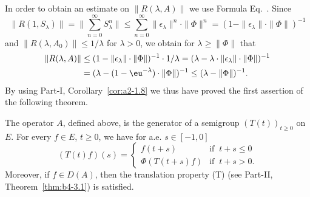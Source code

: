 In order to obtain an estimate on $\|R(\lambda,A)\|$ we use Formula Eq.~.
Since 
\[ 
\|R(1,S_{\lambda})\| = \|\sum_{n=0}^{\infty} S_{\lambda}^n\| \leq \sum_{n=0}^{\infty} \|\epsilon_{\lambda}\|^n \cdot \|\Phi\|^n = (1-\|\epsilon_{\lambda}\| \cdot \|\Phi\|)^{-1}
\]
and $\|R(\lambda,A_0)\| \leq 1/\lambda$ for $\lambda > 0$, we obtain for $\lambda \geq \|\Phi\|$ that
\begin{align*}
\|R(\lambda,A)\| &\leq (1 - \|\epsilon_{\lambda}\| \cdot \|\Phi\|)^{-1} \cdot 1/\lambda = (\lambda - \lambda \cdot \|\epsilon_{\lambda}\| \cdot \|\Phi\|)^{-1} \\
&= (\lambda - (1 - \eu^{-\lambda}) \cdot \|\Phi\|)^{-1} \leq (\lambda - \|\Phi\|)^{-1}.
\end{align*}
By using Part-I, Corollary~\ref{cor:a2-1.8} we thus have proved the first assertion of the following theorem.
\begin{theorem}\label{thm:c4-3.1}
%
%
The operator $A$, defined above, is the generator of a semigroup $(T(t))_{t \geq 0}$ on $E$.
For every $f \in E$, $t \geq 0$, we have for a.e. $s \in [-1,0]$
\begin{equation}\label{eq:c4-3.3}
(T(t)f)(s) = \begin{cases}
    f(t+s) & \text{if } \ t+s \leq 0 \\
    \Phi(T(t+s)f) & \text{if } \ t+s > 0.
\end{cases}
\end{equation}
Moreover, if\/ $f \in D(A)$, then the translation property (T) (see Part-II, Theorem~\ref{thm:b4-3.1}) is satisfied.
\end{theorem}
